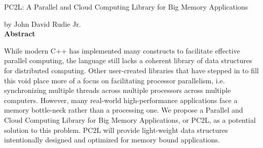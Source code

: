 \documentclass[12pt, oneside]{book2}
\begin{document}
\thispagestyle{empty}
\singlespacing

\begin{center}

\vspace{2.0cm}
PC2L: A Parallel and Cloud Computing Library for Big Memory Applications
\vspace{1.0cm}

by John David Rudie Jr.
\vspace{1.0cm} \\
\textbf{Abstract}
\end{center}
	While modern C++ has implemented many constructs to facilitate effective parallel computing, the language still lacks a coherent library of data structures for distributed computing. Other user-created libraries that have stepped in to fill this void place more of a focus on facilitating processor parallelism, i.e. synchronizing multiple threads across multiple processors across multiple computers. However, many real-world high-performance applications face a memory bottle-neck rather than a processing one. We propose a Parallel and Cloud Computing Library for Big Memory Applications, or PC2L, as a potential solution to this problem. PC2L will provide light-weight data structures intentionally designed and optimized for memory bound applications. 


\newpage

\thispagestyle{empty}

\frontmatter

\doublespacing
\end{document}
